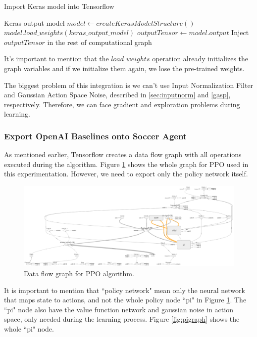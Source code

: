 \begin{algorithm}
	\caption{Import Keras model into Tensorflow}
	\begin{algorithmic} 
		\REQUIRE Keras output model
		\STATE $model \leftarrow createKerasModelStructure()$
		\STATE $model.load\_weights(keras\_output\_model)$
		\STATE $outputTensor \leftarrow model.output$
		\STATE Inject $outputTensor$ in the rest of computational graph
	\end{algorithmic}
	\label{importnetworkpseudocode}
\end{algorithm}

It's important to mention that the $load\_weights$ operation already initializes the graph variables and if we initialize them again, we lose the pre-trained weights.

The biggest problem of this integration is we can't use Input Normalization Filter and Gaussian Action Space Noise, described in \ref{sec:inputnorm} and \ref{gasp}, respectively. Therefore, we can face gradient and exploration problems during learning.

\subsubsection{Export OpenAI Baselines onto Soccer Agent}

As mentioned earlier, Tensorflow creates a data flow graph with all operations executed during the algorithm. Figure \ref{fig:dataflowgraph} shows the whole graph for PPO used in this experimentation. However, we need to export only the policy network itself.

\begin{figure}[!htbp]
	\centering
	\includegraphics[width=1.1\textwidth]{Cap5/dataflowgraph.eps}
	\caption{Data flow graph for PPO algorithm.
	}
	\label{fig:dataflowgraph}
\end{figure}

It is important to mention that ``policy network" mean only the neural network that maps state to actions, and not the whole policy node ``pi" in Figure \ref{fig:dataflowgraph}. The ``pi" node also have the value function network and gaussian noise in action space, only needed during the learning process. Figure \ref{fig:pigraph} shows the whole ``pi" node.

